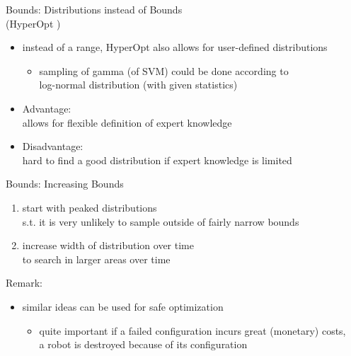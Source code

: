 \begin{frame}[c]{Bounds: Distributions instead of Bounds\\ (HyperOpt )}

\begin{itemize}
  \item instead of a range, HyperOpt also allows for user-defined distributions
  \begin{itemize}
    \item sampling of gamma (of SVM) could be done according to\\ log-normal distribution (with given statistics) 
  \end{itemize}
  \item Advantage:\\ allows for flexible definition of expert knowledge
  \item Disadvantage:\\ hard to find a good distribution if expert knowledge is limited
\end{itemize}

\end{frame}
\begin{frame}[c]{Bounds: Increasing Bounds }

\begin{enumerate}
  \item start with peaked distributions \\ s.t. it is very unlikely to sample outside of fairly narrow bounds
  \item increase width of distribution over time\\ to search in larger areas over time
\end{enumerate}

\bigskip
\pause

Remark:
\begin{itemize}
  \item similar ideas can be used for safe optimization
  \begin{itemize}
    \item quite important if a failed configuration incurs great (monetary) costs, \\
          a robot is destroyed because of its configuration 
  \end{itemize}
\end{itemize}

\end{frame}
